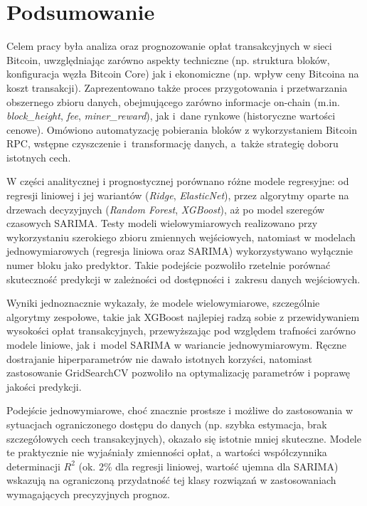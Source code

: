 \documentclass[12pt,a4paper]{report}
\theoremstyle{definition} %
\begin{document}
	\chapter*{Podsumowanie}
	\hspace*{\parindent} Celem pracy była analiza oraz prognozowanie opłat transakcyjnych w sieci Bitcoin, uwzględniając zarówno aspekty techniczne (np. struktura bloków, konfiguracja węzła Bitcoin Core) jak i ekonomiczne (np. wpływ ceny Bitcoina na koszt transakcji). Zaprezentowano także proces przygotowania i przetwarzania obszernego zbioru 			danych, obejmującego zarówno informacje on-chain (m.in. \textit{block\_height}, \textit{fee}, \textit{miner\_reward}), jak i~dane rynkowe (historyczne wartości cenowe). Omówiono automatyzację pobierania bloków z wykorzystaniem Bitcoin RPC, wstępne czyszczenie i~transformację danych, a~także strategię doboru istotnych cech.

	W części analitycznej i prognostycznej porównano różne modele regresyjne: od regresji liniowej i jej wariantów (\textit{Ridge}, \textit{ElasticNet}), przez algorytmy oparte na drzewach decyzyjnych (\textit{Random Forest}, \textit{XGBoost}), aż po model szeregów czasowych SARIMA. Testy modeli wielowymiarowych realizowano przy wykorzystaniu szerokiego zbioru zmiennych wejściowych, natomiast w modelach jednowymiarowych (regresja liniowa oraz SARIMA) wykorzystywano wyłącznie numer bloku jako predyktor. Takie podejście pozwoliło rzetelnie porównać skuteczność predykcji w zależności od dostępności i~zakresu danych wejściowych.
	
	Wyniki jednoznacznie wykazały, że modele wielowymiarowe, szczególnie algorytmy zespołowe, takie jak XGBoost najlepiej radzą sobie z przewidywaniem wysokości opłat transakcyjnych, przewyższając pod względem trafności zarówno modele liniowe, jak i~model SARIMA w wariancie jednowymiarowym. Ręczne dostrajanie hiperparametrów nie dawało istotnych korzyści, natomiast zastosowanie GridSearchCV pozwoliło na optymalizację parametrów i poprawę jakości predykcji.

	Podejście jednowymiarowe, choć znacznie prostsze i możliwe do zastosowania w sytuacjach ograniczonego dostępu do danych (np. szybka estymacja, brak szczegółowych cech transakcyjnych), okazało się istotnie mniej skuteczne. Modele te praktycznie nie wyjaśniały zmienności opłat, a wartości współczynnika determinacji $R^2$ (ok. 2\% dla regresji liniowej, wartość ujemna dla SARIMA) wskazują na ograniczoną przydatność tej klasy rozwiązań w zastosowaniach wymagających precyzyjnych prognoz.
\end{document}
